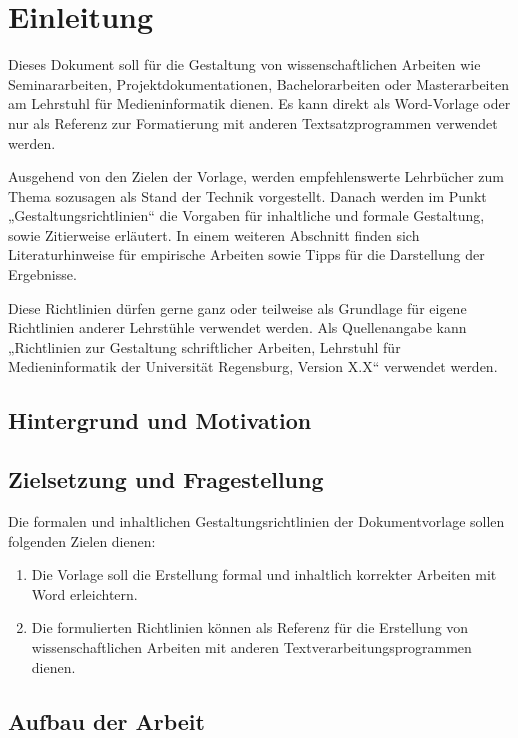 \chapter{Einleitung}\label{sec:Einleitung}
\pagestyle{headings} %
Dieses Dokument soll für die Gestaltung von wissenschaftlichen Arbeiten wie Seminararbeiten, Projektdokumentationen, Bachelorarbeiten oder Masterarbeiten am Lehrstuhl für Medieninformatik dienen. Es kann direkt als Word-Vorlage oder nur als Referenz zur Formatierung mit anderen Textsatzprogrammen verwendet werden. 

Ausgehend von den Zielen der Vorlage, werden empfehlenswerte Lehrbücher zum Thema sozusagen als Stand der Technik vorgestellt. Danach werden im Punkt „Gestaltungsrichtlinien“ die Vorgaben für inhaltliche und formale Gestaltung, sowie Zitierweise erläutert. In einem weiteren Abschnitt finden sich Literaturhinweise für empirische Arbeiten sowie Tipps für die Darstellung der Ergebnisse.

Diese Richtlinien dürfen gerne ganz oder teilweise als Grundlage für eigene Richtlinien anderer Lehrstühle verwendet werden. Als Quellenangabe kann „Richtlinien zur Gestaltung schriftlicher Arbeiten, Lehrstuhl für Medieninformatik der Universität Regensburg, Version X.X“ verwendet werden.

\section{Hintergrund und Motivation}

\section{Zielsetzung und Fragestellung}

Die formalen und inhaltlichen Gestaltungsrichtlinien der Dokumentvorlage sollen folgenden Zielen dienen:

\begin{enumerate}
    \item{Die Vorlage soll die Erstellung formal und inhaltlich korrekter Arbeiten mit Word erleichtern.}
    \item{Die formulierten Richtlinien können als Referenz für die Erstellung von wissenschaftlichen Arbeiten mit anderen Textverarbeitungsprogrammen dienen.}
\end{enumerate}

\section{Aufbau der Arbeit}

